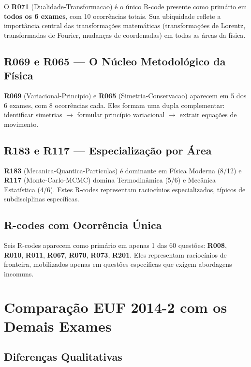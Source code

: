\documentclass[12pt,a4paper]{article}
\newcommand{\rcode}[1]{\textcolor{azulprof}{\textbf{#1}}}
\begin{document}
O \rcode{R071} (Dualidade-Transformacao) é o único R-code presente como
primário em \textbf{todos os 6 exames}, com 10 ocorrências totais. Sua
ubiquidade reflete a importância central das transformações matemáticas
(transformações de Lorentz, transformadas de Fourier, mudanças de
coordenadas) em todas as áreas da física.

\subsection{R069 e R065 --- O Núcleo Metodológico da Física}

\rcode{R069} (Variacional-Principio) e \rcode{R065}
(Simetria-Conservacao) aparecem em 5 dos 6 exames, com 8 ocorrências
cada. Eles formam uma dupla complementar: identificar simetrias $\to$
formular princípio variacional $\to$ extrair equações de movimento.

\subsection{R183 e R117 --- Especialização por Área}

\rcode{R183} (Mecanica-Quantica-Particulas) é dominante em Física
Moderna (8/12) e \rcode{R117} (Monte-Carlo-MCMC) domina Termodinâmica
(5/6) e Mecânica Estatística (4/6). Estes R-codes representam
raciocínios especializados, típicos de subdisciplinas específicas.

\subsection{R-codes com Ocorrência Única}

Seis R-codes aparecem como primário em apenas 1 das 60 questões:
\rcode{R008}, \rcode{R010}, \rcode{R011}, \rcode{R067}, \rcode{R070},
\rcode{R073}, \rcode{R201}. Eles representam raciocínios de fronteira,
mobilizados apenas em questões específicas que exigem abordagens
incomuns.

\section{Comparação EUF 2014-2 com os Demais Exames}

\subsection{Diferenças Qualitativas}
\end{document}
